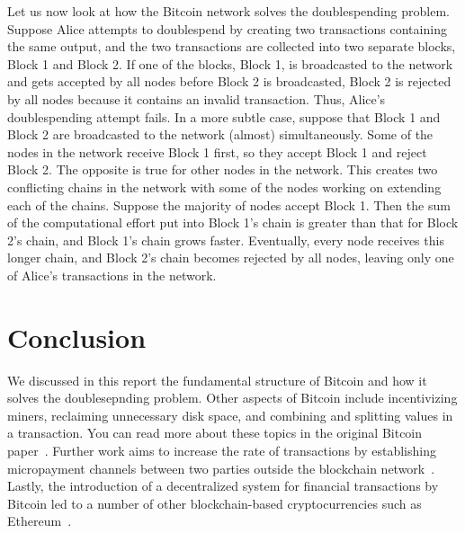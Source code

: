 \documentclass{article}
\begin{document}
Let us now look at how the Bitcoin network solves the doublespending problem.
Suppose Alice attempts to doublespend by creating two transactions containing
the same output, and the two transactions are collected into two separate
blocks, Block 1 and Block 2. If one of the blocks, Block 1, is broadcasted to
the network and gets accepted by all nodes before Block 2 is broadcasted, Block
2 is rejected by all nodes because it contains an invalid transaction. Thus,
Alice’s doublespending attempt fails. In a more subtle case, suppose that Block
1 and Block 2 are broadcasted to the network (almost) simultaneously. Some of
the nodes in the network receive Block 1 first, so they accept Block 1 and
reject Block 2. The opposite is true for other nodes in the network. This
creates two conflicting chains in the network with some of the nodes working on
extending each of the chains. Suppose the majority of nodes accept Block 1. Then
the sum of the computational effort put into Block 1’s chain is greater than
that for Block 2’s chain, and Block 1’s chain grows faster. Eventually, every
node receives this longer chain, and Block 2’s chain becomes rejected by all
nodes, leaving only one of Alice’s transactions in the network.

\section{Conclusion}

We discussed in this report the fundamental structure of Bitcoin and how it
solves the doublesepnding problem. Other aspects of Bitcoin include
incentivizing miners, reclaiming unnecessary disk space, and combining and
splitting values in a transaction. You can read more about these topics in the
original Bitcoin paper~\citep{Nakamoto08}. Further work aims to increase the
rate of transactions  by establishing micropayment channels between two parties
outside the blockchain network~\citep{Decker15}. Lastly, the introduction of a
decentralized system for financial transactions by Bitcoin led to a number of
other blockchain-based cryptocurrencies such as Ethereum~\citep{Buterin14}.



\end{document}
